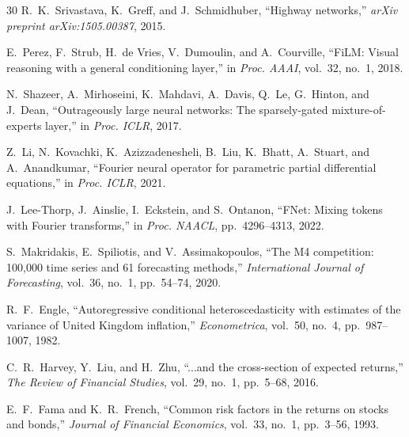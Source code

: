 \documentclass[conference]{IEEEtran}
\begin{document}
\begin{thebibliography}{30}
R.~K.~Srivastava, K.~Greff, and J.~Schmidhuber, ``Highway networks,'' \textit{arXiv preprint arXiv:1505.00387}, 2015.

E.~Perez, F.~Strub, H.~de Vries, V.~Dumoulin, and A.~Courville, ``FiLM: Visual reasoning with a general conditioning layer,'' in \textit{Proc. AAAI}, vol.~32, no.~1, 2018.

N.~Shazeer, A.~Mirhoseini, K.~Mahdavi, A.~Davis, Q.~Le, G.~Hinton, and J.~Dean, ``Outrageously large neural networks: The sparsely-gated mixture-of-experts layer,'' in \textit{Proc. ICLR}, 2017.

Z.~Li, N.~Kovachki, K.~Azizzadenesheli, B.~Liu, K.~Bhatt, A.~Stuart, and A.~Anandkumar, ``Fourier neural operator for parametric partial differential equations,'' in \textit{Proc. ICLR}, 2021.

J.~Lee-Thorp, J.~Ainslie, I.~Eckstein, and S.~Ontanon, ``FNet: Mixing tokens with Fourier transforms,'' in \textit{Proc. NAACL}, pp.~4296--4313, 2022.

S.~Makridakis, E.~Spiliotis, and V.~Assimakopoulos, ``The M4 competition: 100,000 time series and 61 forecasting methods,'' \textit{International Journal of Forecasting}, vol.~36, no.~1, pp.~54--74, 2020.

R.~F.~Engle, ``Autoregressive conditional heteroscedasticity with estimates of the variance of United Kingdom inflation,'' \textit{Econometrica}, vol.~50, no.~4, pp.~987--1007, 1982.

C.~R.~Harvey, Y.~Liu, and H.~Zhu, ``...and the cross-section of expected returns,'' \textit{The Review of Financial Studies}, vol.~29, no.~1, pp.~5--68, 2016.

E.~F.~Fama and K.~R.~French, ``Common risk factors in the returns on stocks and bonds,'' \textit{Journal of Financial Economics}, vol.~33, no.~1, pp.~3--56, 1993.

\end{thebibliography}
\end{document}
